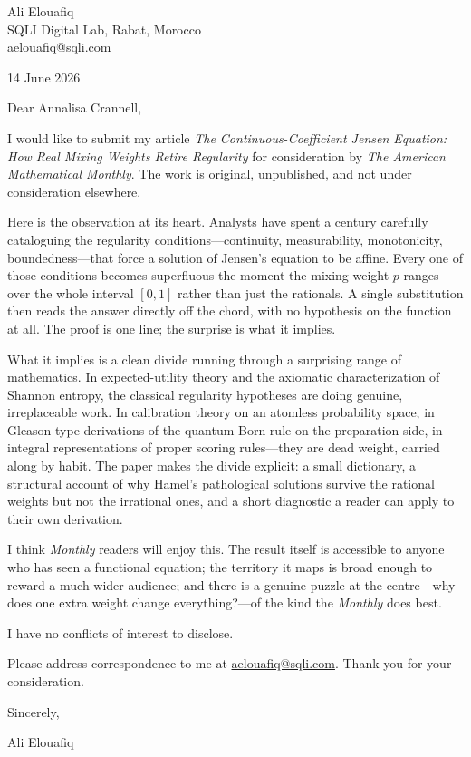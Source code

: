 \documentclass[12pt]{article}
\begin{document}
Ali Elouafiq\\
SQLI Digital Lab, Rabat, Morocco\\
\href{mailto:aelouafiq@sqli.com}{aelouafiq@sqli.com}

14 June 2026

Dear Annalisa Crannell,

I would like to submit my article \textit{The Continuous-Coefficient
Jensen Equation: How Real Mixing Weights Retire Regularity} for
consideration by \textit{The American Mathematical Monthly}. The work
is original, unpublished, and not under consideration elsewhere.

Here is the observation at its heart. Analysts have spent a century
carefully cataloguing the regularity conditions---continuity,
measurability, monotonicity, boundedness---that force a solution of
Jensen's equation to be affine. Every one of those conditions becomes
superfluous the moment the mixing weight $p$ ranges over the whole
interval $[0,1]$ rather than just the rationals. A single substitution
then reads the answer directly off the chord, with no hypothesis on the
function at all. The proof is one line; the surprise is what it
implies.

What it implies is a clean divide running through a surprising range of
mathematics. In expected-utility theory and the axiomatic
characterization of Shannon entropy, the classical regularity hypotheses
are doing genuine, irreplaceable work. In calibration theory on an
atomless probability space, in Gleason-type derivations of the quantum
Born rule on the preparation side, in integral representations of proper
scoring rules---they are dead weight, carried along by habit. The paper
makes the divide explicit: a small dictionary, a structural account of
why Hamel's pathological solutions survive the rational weights but not
the irrational ones, and a short diagnostic a reader can apply to their
own derivation.

I think \textit{Monthly} readers will enjoy this. The result itself is
accessible to anyone who has seen a functional equation; the territory
it maps is broad enough to reward a much wider audience; and there is a
genuine puzzle at the centre---why does one extra weight change
everything?---of the kind the \textit{Monthly} does best.

I have no conflicts of interest to disclose.

Please address correspondence to me at
\href{mailto:aelouafiq@sqli.com}{aelouafiq@sqli.com}.
Thank you for your consideration.

Sincerely,

\vspace{16pt}
Ali Elouafiq
\end{document}
